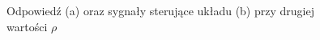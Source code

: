 \documentclass{article}
\begin{document}
\begin{figure}[H]
    \centering
    \caption{Odpowiedź (a) oraz sygnały sterujące układu (b) przy drugiej wartości $\rho$}
    \label{fig:2z}
\end{figure}
\end{document}
